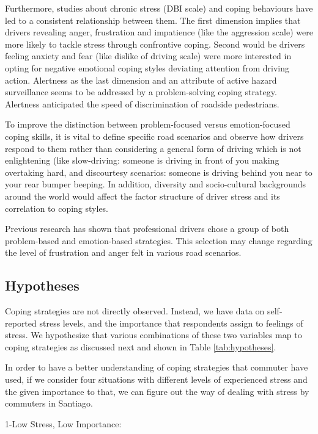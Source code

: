 \documentclass[
11pt, %
oneside, %
english, %
singlespacing, %
]{macthesis} %
\begin{document}
Furthermore, studies about chronic stress (DBI scale) and coping behaviours have led to a consistent relationship between them. The first dimension implies that drivers revealing anger, frustration and impatience (like the aggression scale) were more likely to tackle stress through confrontive coping. Second would be drivers feeling anxiety and fear (like dislike of driving scale) were more interested in opting for negative emotional coping styles deviating attention from driving action. Alertness as the last dimension and an attribute of active hazard surveillance seems to be addressed by a problem-solving coping strategy. Alertness anticipated the speed of discrimination of roadside pedestrians.

To improve the distinction between problem-focused versus emotion-focused coping skills, it is vital to define specific road scenarios and observe how drivers respond to them rather than considering a general form of driving which is not enlightening (like slow-driving: someone is driving in front of you making overtaking hard, and discourtesy scenarios: someone is driving behind you near to your rear bumper beeping. In addition, diversity and socio-cultural backgrounds around the world would affect the factor structure of driver stress and its correlation to coping styles.

Previous research has shown that professional drivers chose a group of both problem-based and emotion-based strategies. This selection may change regarding the level of frustration and anger felt in various road scenarios.

\hypertarget{hypotheses}{%
\subsection{Hypotheses}\label{hypotheses}}

Coping strategies are not directly observed. Instead, we have data on self-reported stress levels, and the importance that respondents assign to feelings of stress. We hypothesize that various combinations of these two variables map to coping strategies as discussed next and shown in Table \ref{tab:hypotheses}.

In order to have a better understanding of coping strategies that commuter have used, if we consider four situations with different levels of experienced stress and the given importance to that, we can figure out the way of dealing with stress by commuters in Santiago.

1-Low Stress, Low Importance:
\end{document}
